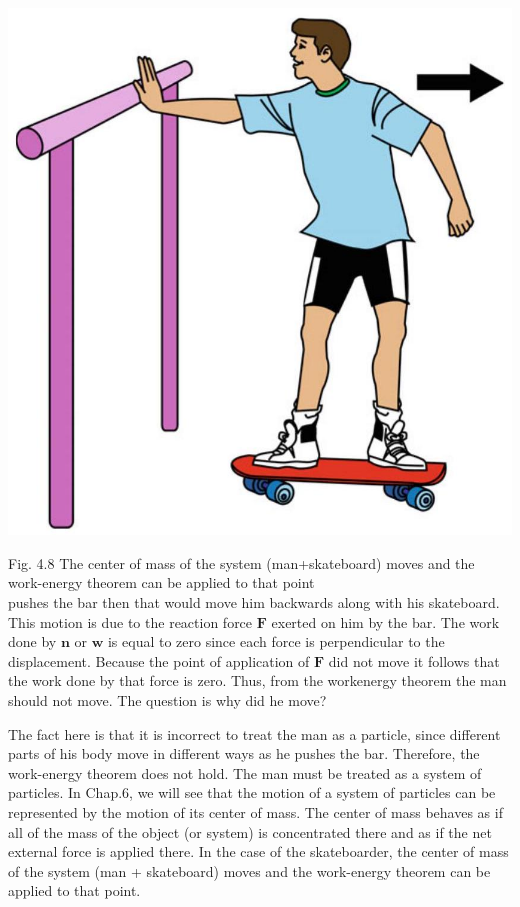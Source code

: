 \documentclass[10pt]{article}
\begin{document}
\begin{center}
\includegraphics[max width=\textwidth]{2024_09_13_db1f357d2aad0a03eb2eg-065(2)}
\end{center}

Fig. 4.8 The center of mass of the system (man+skateboard) moves and the work-energy theorem can be applied to that point\\
pushes the bar then that would move him backwards along with his skateboard. This motion is due to the reaction force $\mathbf{F}$ exerted on him by the bar. The work done by $\mathbf{n}$ or $\mathbf{w}$ is equal to zero since each force is perpendicular to the displacement. Because the point of application of $\mathbf{F}$ did not move it follows that the work done by that force is zero. Thus, from the workenergy theorem the man should not move. The question is why did he move?

The fact here is that it is incorrect to treat the man as a particle, since different parts of his body move in different ways as he pushes the bar. Therefore, the work-energy theorem does not hold. The man must be treated as a system of particles. In Chap.6, we will see that the motion of a system of particles can be represented by the motion of its center of mass. The center of mass behaves as if all of the mass of the object (or system) is concentrated there and as if the net external force is applied there. In the case of the skateboarder, the center of mass of the system (man + skateboard) moves and the work-energy theorem can be applied to that point.
\end{document}
